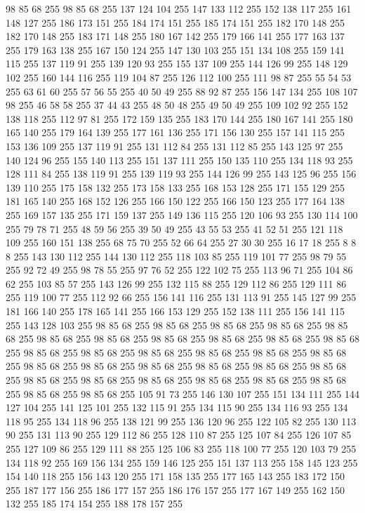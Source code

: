 98 85 68 255 98 85 68 255 137 124 104 255 147 133 112 255 152 138 117 255 161 148 127 255 186 173 151 255 184 174 151 255 185 174 151 255 182 170 148 255 182 170 148 255 183 171 148 255 180 167 142 255 179 166 141 255 177 163 137 255 179 163 138 255 167 150 124 255 147 130 103 255 151 134 108 255 159 141 115 255 137 119 91 255 139 120 93 255 155 137 109 255 144 126 99 255 148 129 102 255 160 144 116 255 119 104 87 255 126 112 100 255 111 98 87 255 55 54 53 255 63 61 60 255 57 56 55 255 40 50 49 255 88 92 87 255 156 147 134 255 108 107 98 255 46 58 58 255 37 44 43 255 48 50 48 255 49 50 49 255 109 102 92 255 152 138 118 255 112 97 81 255 172 159 135 255 183 170 144 255 180 167 141 255 180 165 140 255 179 164 139 255 177 161 136 255 171 156 130 255 157 141 115 255 153 136 109 255 137 119 91 255 131 112 84 255 131 112 85 255 143 125 97 255 140 124 96 255 155 140 113 255 151 137 111 255 150 135 110 255 134 118 93 255 128 111 84 255 138 119 91 255 139 119 93 255
144 126 99 255 143 125 96 255 156 139 110 255 175 158 132 255 173 158 133 255 168 153 128 255 171 155 129 255 181 165 140 255 168 152 126 255 166 150 122 255 166 150 123 255 177 164 138 255 169 157 135 255 171 159 137 255 149 136 115 255 120 106 93 255 130 114 100 255 79 78 71 255 48 59 56 255 39 50 49 255 43 55 53 255 41 52 51 255 121 118 109 255 160 151 138 255 68 75 70 255 52 66 64 255 27 30 30 255 16 17 18 255 8 8 8 255 143 130 112 255 144 130 112 255 118 103 85 255 119 101 77 255 98 79 55 255 92 72 49 255 98 78 55 255 97 76 52 255 122 102 75 255 113 96 71 255 104 86 62 255 103 85 57 255 143 126 99 255 132 115 88 255 129 112 86 255 129 111 86 255 119 100 77 255 112 92 66 255 156 141 116 255 131 113 91 255 145 127 99 255 181 166 140 255 178 165 141 255 166 153 129 255 152 138 111 255 156 141 115 255 143 128 103 255 98 85 68 255 98 85 68 255 98 85 68 255 98 85 68 255 98 85 68 255 98 85 68 255 98 85 68 255 98 85 68 255
98 85 68 255 98 85 68 255 98 85 68 255 98 85 68 255 98 85 68 255 98 85 68 255 98 85 68 255 98 85 68 255 98 85 68 255 98 85 68 255 98 85 68 255 98 85 68 255 98 85 68 255 98 85 68 255 98 85 68 255 98 85 68 255 98 85 68 255 98 85 68 255 98 85 68 255 98 85 68 255 98 85 68 255 98 85 68 255 98 85 68 255 105 91 73 255 146 130 107 255 151 134 111 255 144 127 104 255 141 125 101 255 132 115 91 255 134 115 90 255 134 116 93 255 134 118 95 255 134 118 96 255 138 121 99 255 136 120 96 255 122 105 82 255 130 113 90 255 131 113 90 255 129 112 86 255 128 110 87 255 125 107 84 255 126 107 85 255 127 109 86 255 129 111 88 255 125 106 83 255 118 100 77 255 120 103 79 255 134 118 92 255 169 156 134 255 159 146 125 255 151 137 113 255 158 145 123 255 154 140 118 255 156 143 120 255 171 158 135 255 177 165 143 255 183 172 150 255 187 177 156 255 186 177 157 255 186 176 157 255 177 167 149 255 162 150 132 255 185 174 154 255 188 178 157 255
